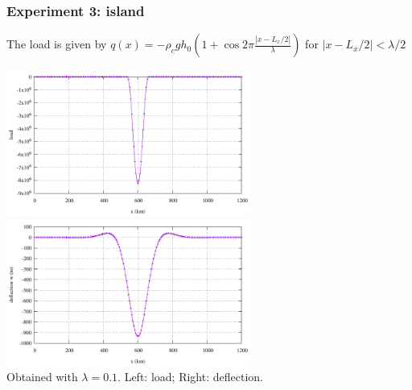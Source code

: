 \subsubsection*{Experiment 3: island}

The load is given by $q(x)=-\rho_c g h_0 \left(1+\cos 2\pi \frac{|x-L_x/2|}{\lambda}\right) $
for $|x-L_x/2|<\lambda/2$ 

\begin{center}
\includegraphics[width=8cm]{python_codes/fieldstone_105/results/exp3/load}
\includegraphics[width=8cm]{python_codes/fieldstone_105/results/exp3/w.pdf}\\
{\captionfont Obtained with $\lambda=0.1$. Left: load; Right: deflection.}
\end{center}



